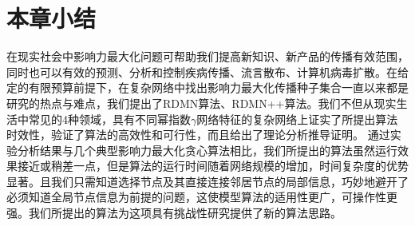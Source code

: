 \section{本章小结}
在现实社会中影响力最大化问题可帮助我们提高新知识、新产品的传播有效范围，同时也可以有效的预测、分析和控制疾病传播、流言散布、计算机病毒扩散。在给定的有限预算前提下，在复杂网络中找出影响力最大化传播种子集合一直以来都是研究的热点与难点，我们提出了RDMN算法、RDMN++算法。我们不但从现实生活中常见的4种领域，具有不同幂指数$\gamma$网络特征的复杂网络上证实了所提出算法时效性，验证了算法的高效性和可行性，而且给出了理论分析推导证明。
通过实验分析结果与几个典型影响力最大化贪心算法相比，我们所提出的算法虽然运行效果接近或稍差一点，但是算法的运行时间随着网络规模的增加，时间复杂度的优势显著。且我们只需知道选择节点及其直接连接邻居节点的局部信息，巧妙地避开了必须知道全局节点信息为前提的问题，这使模型算法的适用性更广，可操作性更强。我们所提出的算法为这项具有挑战性研究提供了新的算法思路。

